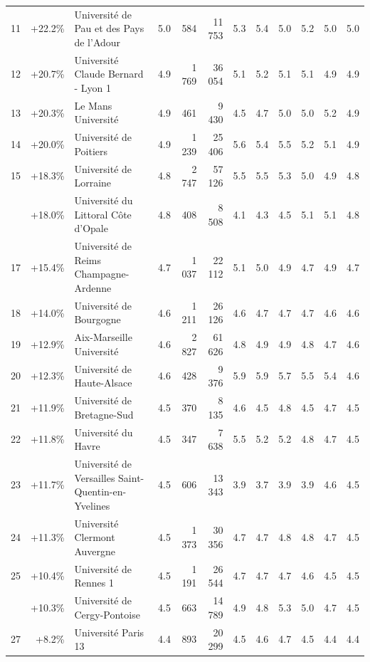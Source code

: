 \documentclass[12pt,french,landscape]{article}
\begin{document}
\begin{longtable}{rrlrrrrrrlrr}
\addlinespace
\rowcolor{gray!6}  11 & +22.2\% & Université de Pau et des Pays de l'Adour & 5.0 & 584 & 11 753 & 5.3 & 5.4 & 5.0 & 5.2 & 5.0 & 5.0\\
12 & +20.7\% & Université Claude Bernard - Lyon 1 & 4.9 & 1 769 & 36 054 & 5.1 & 5.2 & 5.1 & 5.1 & 4.9 & 4.9\\
\rowcolor{gray!6}  13 & +20.3\% & Le Mans Université & 4.9 & 461 & 9 430 & 4.5 & 4.7 & 5.0 & 5.0 & 5.2 & 4.9\\
14 & +20.0\% & Université de Poitiers & 4.9 & 1 239 & 25 406 & 5.6 & 5.4 & 5.5 & 5.2 & 5.1 & 4.9\\
\rowcolor{gray!6}  15 & +18.3\% & Université de Lorraine & 4.8 & 2 747 & 57 126 & 5.5 & 5.5 & 5.3 & 5.0 & 4.9 & 4.8\\
\addlinespace
16 & +18.0\% & Université du Littoral Côte d'Opale & 4.8 & 408 & 8 508 & 4.1 & 4.3 & 4.5 & 5.1 & 5.1 & 4.8\\
\rowcolor{gray!6}  17 & +15.4\% & Université de Reims Champagne-Ardenne & 4.7 & 1 037 & 22 112 & 5.1 & 5.0 & 4.9 & 4.7 & 4.9 & 4.7\\
18 & +14.0\% & Université de Bourgogne & 4.6 & 1 211 & 26 126 & 4.6 & 4.7 & 4.7 & 4.7 & 4.6 & 4.6\\
\rowcolor{gray!6}  19 & +12.9\% & Aix-Marseille Université & 4.6 & 2 827 & 61 626 & 4.8 & 4.9 & 4.9 & 4.8 & 4.7 & 4.6\\
20 & +12.3\% & Université de Haute-Alsace & 4.6 & 428 & 9 376 & 5.9 & 5.9 & 5.7 & 5.5 & 5.4 & 4.6\\
\addlinespace
\rowcolor{gray!6}  21 & +11.9\% & Université de Bretagne-Sud & 4.5 & 370 & 8 135 & 4.6 & 4.5 & 4.8 & 4.5 & 4.7 & 4.5\\
22 & +11.8\% & Université du Havre & 4.5 & 347 & 7 638 & 5.5 & 5.2 & 5.2 & 4.8 & 4.7 & 4.5\\
\rowcolor{gray!6}  23 & +11.7\% & Université de Versailles Saint-Quentin-en-Yvelines & 4.5 & 606 & 13 343 & 3.9 & 3.7 & 3.9 & 3.9 & 4.6 & 4.5\\
24 & +11.3\% & Université Clermont Auvergne & 4.5 & 1 373 & 30 356 & 4.7 & 4.7 & 4.8 & 4.8 & 4.7 & 4.5\\
\rowcolor{gray!6}  25 & +10.4\% & Université de Rennes 1 & 4.5 & 1 191 & 26 544 & 4.7 & 4.7 & 4.7 & 4.6 & 4.5 & 4.5\\
\addlinespace
26 & +10.3\% & Université de Cergy-Pontoise & 4.5 & 663 & 14 789 & 4.9 & 4.8 & 5.3 & 5.0 & 4.7 & 4.5\\
\rowcolor{gray!6}  27 & +8.2\% & Université Paris 13 & 4.4 & 893 & 20 299 & 4.5 & 4.6 & 4.7 & 4.5 & 4.4 & 4.4\\

\end{longtable}
\end{document}
